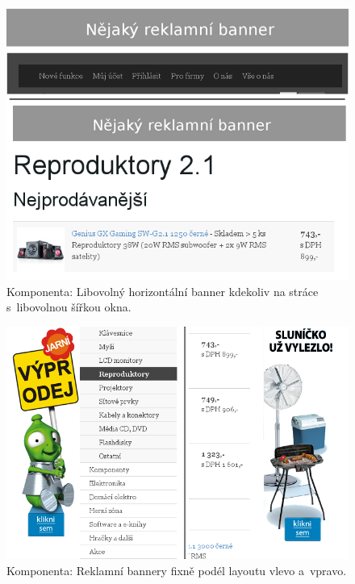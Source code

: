 \documentclass[thesis=B,czech]{FITthesis}[2012/06/26]
\begin{document}
\begin{figure}[h]
	\begin{center}
	\includegraphics[scale=0.6]{images/image23.png}
	\end{center}
	\caption[Horizontální banner]{Komponenta: Libovolný horizontální banner kdekoliv na stráce s~libovolnou šířkou okna.}
	\label{imgBan}
\end{figure}
\begin{figure}[h]
	\begin{center}
	\includegraphics[scale=0.6]{images/image25.png}
	\end{center}
	\caption{Komponenta: Reklamní bannery fixně podél layoutu vlevo a~vpravo.}
	\label{imgBan2}
\end{figure}
\end{document}
